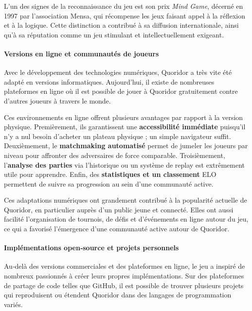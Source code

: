 \documentclass[a4paper]{article}
\begin{document}
L’un des signes de la reconnaissance du jeu est son prix \textit{Mind Game}, décerné en 1997 par l’association Mensa, qui récompense les jeux faisant appel à la réflexion et à la logique. Cette distinction a contribué à sa diffusion internationale, ainsi qu’à sa réputation comme un jeu stimulant et intellectuellement exigeant.

\paragraph{Versions en ligne et communautés de joueurs}

Avec le développement des technologies numériques, Quoridor a très vite été adapté en versions informatiques. Aujourd’hui, il existe de nombreuses plateformes en ligne où il est possible de jouer à Quoridor gratuitement contre d’autres joueurs à travers le monde.

Ces environnements en ligne offrent plusieurs avantages par rapport à la version physique. Premièrement, ils garantissent une \textbf{accessibilité immédiate} puisqu'il n'y a nul besoin d'acheter un plateau physique ; un simple navigateur suffit. Deuxièmement, le \textbf{matchmaking automatisé} permet de jumeler les joueurs par niveau pour affronter des adversaires de force comparable. Troisièmement, l'\textbf{analyse des parties} via l'historique ou un système de replay est extrêmement utile pour apprendre. Enfin, des \textbf{statistiques et un classement} ELO permettent de suivre sa progression au sein d'une communauté active.

Ces adaptations numériques ont grandement contribué à la popularité actuelle de Quoridor, en particulier auprès d’un public jeune et connecté. Elles ont aussi facilité l’organisation de tournois, de défis et d’événements en ligne autour du jeu, ce qui a favorisé l’émergence d’une communauté active autour de Quoridor.

\paragraph{Implémentations open‑source et projets personnels}

Au‑delà des versions commerciales et des plateformes en ligne, le jeu a inspiré de nombreux passionnés à créer leurs propres implémentations. Sur des plateformes de partage de code telles que GitHub, il est possible de trouver plusieurs projets qui reproduisent ou étendent Quoridor dans des langages de programmation variés.
\end{document}
